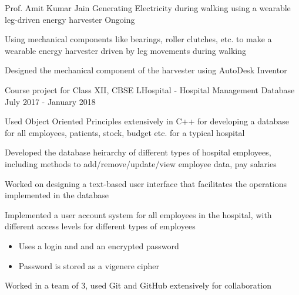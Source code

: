 \begin{cventries}
  \cventry
    {Prof. Amit Kumar Jain}
    {Generating Electricity during walking using a wearable leg-driven energy harvester}
    {}
    {Ongoing}
    {
      \begin{cvitems}
        \item {Using mechanical components like bearings, roller clutches, etc. to make a wearable energy harvester driven by leg movements during walking}
        \item {Designed the mechanical component of the harvester using AutoDesk Inventor}
      \end{cvitems}
    }
  \cventry
    {Course project for Class XII, CBSE}
    {LHospital - Hospital Management Database}
    {}
    {July 2017 - January 2018}
    {
      \begin{cvitems}
        \item {Used Object Oriented Principles extensively in C++ for developing a database for all employees, patients, stock, budget etc. for a typical hospital}
        \item {Developed the database heirarchy of different types of hospital employees, including methods to add/remove/update/view employee data, pay salaries }
        \item {Worked on designing a text-based user interface that facilitates the operations implemented in the database}
        \item {
          Implemented a user account system for all employees in the hospital, with different access levels for different types of employees
          \begin{itemize} 
            \item {Uses a login and and an encrypted password}
            \item {Password is stored as a vigenere cipher}
          \end{itemize}
        }
        \item {Worked in a team of 3, used Git and GitHub extensively for collaboration}
      \end{cvitems}
    }
\end{cventries}
